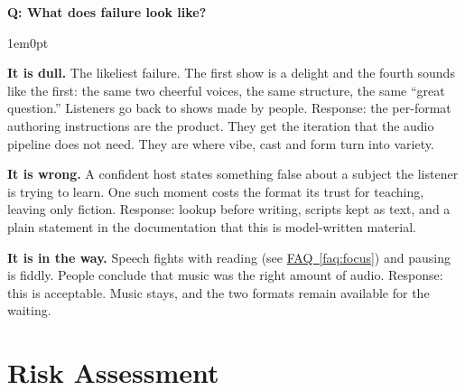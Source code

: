 \documentclass[11pt,letterpaper]{article} %
\newcounter{faqnum} %
\newenvironment{faqpair}[1]{%
  \needspace{4\baselineskip}%
  \vspace{0.5em}%
  \refstepcounter{faqnum}%
  \noindent\textbf{\color{SectionBlue}Q\thefaqnum: #1}\par\nopagebreak[4]%
  \vspace{0.2em}%
  \begin{adjustwidth}{1em}{0pt}%
  \setlength{\parindent}{0pt}%
  \setlength{\parskip}{0.5em}%
}{%
  \end{adjustwidth}%
  \vspace{0.5em}%
}
\newcommand{\faqref}[1]{\hyperref[#1]{FAQ~\ref*{#1}}}
\begin{document}
\begin{faqpair}{What does failure look like?}\label{faq:failure}

  \textbf{It is dull.} The likeliest failure. The first show is a delight
  and the fourth sounds like the first: the same two cheerful voices, the
  same structure, the same ``great question.'' Listeners go back to shows
  made by people. Response: the per-format authoring instructions are the
  product. They get the iteration that the audio pipeline does not need.
  They are where vibe, cast and form turn into variety.

  \textbf{It is wrong.} A confident host states something false about a
  subject the listener is trying to learn. One such moment costs the
  format its trust for teaching, leaving only fiction. Response: lookup
  before writing, scripts kept as text, and a plain statement in the
  documentation that this is model-written material.

  \textbf{It is in the way.} Speech fights with reading
  (see \faqref{faq:focus}) and pausing is fiddly. People conclude that
  music was the right amount of audio. Response: this is acceptable.
  Music stays, and the two formats remain available for the waiting.
\end{faqpair}


\newpage
\section*{Risk Assessment}
\end{document}

